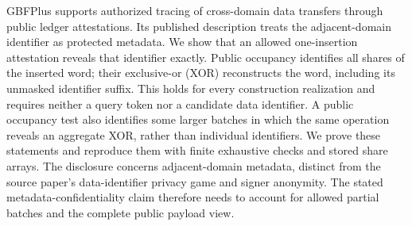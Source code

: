 GBFPlus supports authorized tracing of cross-domain data transfers through
public ledger attestations. Its published description treats the adjacent-domain
identifier as protected metadata. We show that an allowed one-insertion
attestation reveals that identifier exactly. Public occupancy identifies all
shares of the inserted word; their exclusive-or (XOR) reconstructs the word,
including its unmasked identifier suffix. This holds for every construction
realization and requires neither a query token nor a candidate data identifier.
A public occupancy test also identifies some larger batches in which the same
operation reveals an aggregate XOR, rather than individual identifiers.
We prove these statements and reproduce them with finite exhaustive checks and
stored share arrays. The disclosure concerns adjacent-domain metadata, distinct
from the source paper's data-identifier privacy game and signer anonymity.
The stated metadata-confidentiality claim therefore needs to account for allowed
partial batches and the complete public payload view.
